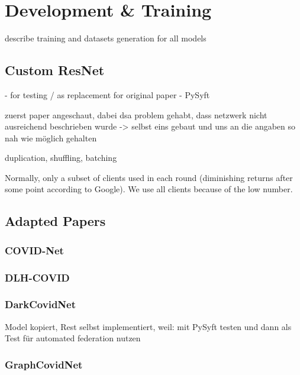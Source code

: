 \section{Development \& Training}\label{sec:dev_and_training}
describe training and datasets generation for all models


\subsection{Custom ResNet}
- for testing / as replacement for original paper
- PySyft

zuerst paper angeschaut, dabei dsa problem gehabt, dass netzwerk nicht ausreichend beschrieben wurde
-> selbst eins gebaut und uns an die angaben so nah wie möglich gehalten

duplication, shuffling, batching

Normally, only a subset of clients used in each round (diminishing returns after some point according to Google). We use all clients because of the low number.

\subsection{Adapted Papers}

\subsubsection{COVID-Net}\label{subsubsec:dev_covidnet}

\subsubsection{DLH-COVID}
\subsubsection{DarkCovidNet}
Model kopiert, Rest selbst implementiert, weil: mit PySyft testen und dann als Test für automated federation nutzen
\subsubsection{GraphCovidNet}


